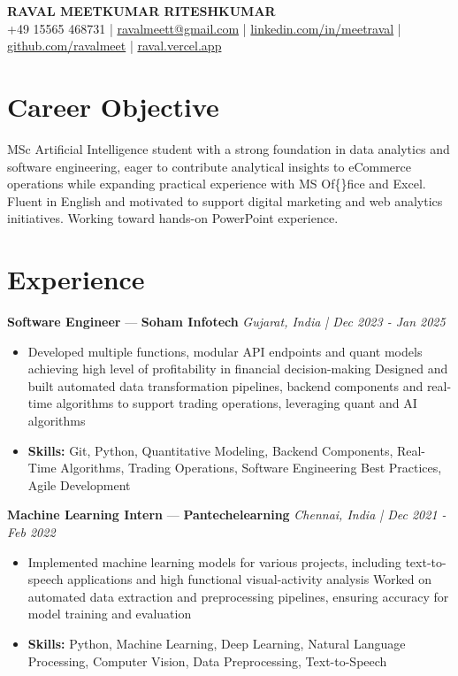 \documentclass[a4paper,10pt]{article}
\begin{document}
\begin{center}
  {\Large\bfseries RAVAL MEETKUMAR RITESHKUMAR}\\[2pt]
  {\small +49 15565 468731 \;|\; \href{mailto:ravalmeett@gmail.com}{ravalmeett@gmail.com} \;|\; \href{https://www.linkedin.com/in/meetraval/}{linkedin.com/in/meetraval} \;|\; \href{https://github.com/ravalmeet}{github.com/ravalmeet} \;|\; \href{https://raval.vercel.app/}{raval.vercel.app}}
\end{center}
\vspace{-3pt}

\section*{Career Objective}
MSc Artificial Intelligence student with a strong foundation in data analytics and software engineering, eager to contribute analytical insights to eCommerce operations while expanding practical experience with MS Of\{\}fice and Excel. Fluent in English and motivated to support digital marketing and web analytics initiatives. Working toward hands-on PowerPoint experience.\par

\section*{Experience}
\textbf{Software Engineer} — \textbf{Soham Infotech} \hfill \textit{Gujarat, India \;|\; Dec 2023 - Jan 2025}\par
\vspace{1pt}
\begin{itemize}
  \item Developed multiple functions, modular API endpoints and quant models achieving high level of profitability in financial decision-making Designed and built automated data transformation pipelines, backend components and real-time algorithms to support trading operations, leveraging quant and AI algorithms
  \item \textbf{Skills:} Git, Python, Quantitative Modeling, Backend Components, Real-Time Algorithms, Trading Operations, Software Engineering Best Practices, Agile Development
\end{itemize}
\vspace{3pt}
\textbf{Machine Learning Intern} — \textbf{Pantechelearning} \hfill \textit{Chennai, India \;|\; Dec 2021 - Feb 2022}\par
\vspace{1pt}
\begin{itemize}
  \item Implemented machine learning models for various projects, including text-to-speech applications and high functional visual-activity analysis Worked on automated data extraction and preprocessing pipelines, ensuring accuracy for model training and evaluation
  \item \textbf{Skills:} Python, Machine Learning, Deep Learning, Natural Language Processing, Computer Vision, Data Preprocessing, Text-to-Speech
\end{itemize}
\end{document}
